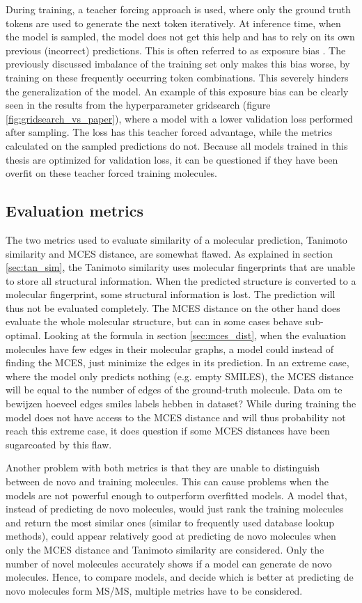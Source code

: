 During training, a teacher forcing approach is used, where only the ground truth tokens are used to generate the next token iteratively.
At inference time, when the model is sampled, the model does not get this help and has to rely on its own previous (incorrect) predictions.
This is often referred to as exposure bias \cite{schmidt2019generalization}.
The previously discussed imbalance of the training set only makes this bias worse, by training on these frequently occurring token combinations.
This severely hinders the generalization of the model.
An example of this exposure bias can be clearly seen in the results from the hyperparameter gridsearch (figure \ref{fig:gridsearch_vs_paper}), where a model with a lower validation loss performed after sampling.
The loss has this teacher forced advantage, while the metrics calculated on the sampled predictions do not.
Because all models trained in this thesis are optimized for validation loss, it can be questioned if they have been overfit on these teacher forced training molecules.

\subsection{Evaluation metrics}
The two metrics used to evaluate similarity of a molecular prediction, Tanimoto similarity and \ac{MCES} distance, are somewhat flawed.
As explained in section \ref{sec:tan_sim}, the Tanimoto similarity uses molecular fingerprints that are unable to store all structural information.
When the predicted structure is converted to a molecular fingerprint, some structural information is lost.
The prediction will thus not be evaluated completely.
The \ac{MCES} distance on the other hand does evaluate the whole molecular structure, but can in some cases behave sub-optimal.
Looking at the formula in section \ref{sec:mces_dist}, when the evaluation molecules have few edges in their molecular graphs, a model could instead of finding the \acf{MCES}, just minimize the edges in its prediction.
In an extreme case, where the model only predicts nothing (e.g. empty SMILES), the MCES distance will be equal to the number of edges of the ground-truth molecule.
Data om te bewijzen hoeveel edges smiles labels hebben in dataset?
While during training the model does not have access to the MCES distance and will thus probability not reach this extreme case, it does question if some \ac{MCES} distances have been sugarcoated by this flaw.

Another problem with both metrics is that they are unable to distinguish between de novo and training molecules.
This can cause problems when the models are not powerful enough to outperform overfitted models.
A model that, instead of predicting de novo molecules, would just rank the training molecules and return the most similar ones (similar to frequently used database lookup methods), could appear relatively good at predicting de novo molecules when only the \ac{MCES} distance and Tanimoto similarity are considered.
Only the number of novel molecules accurately shows if a model can generate de novo molecules.
Hence, to compare models, and decide which is better at predicting de novo molecules form \ac{MS/MS}, multiple metrics have to be considered.


